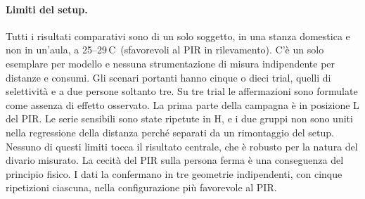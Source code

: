 \paragraph{Limiti del setup.} Tutti i risultati comparativi sono di un solo soggetto,
in una stanza domestica e non in un'aula, a 25--29\,\textdegree C\ (sfavorevoli al PIR
in rilevamento). C'è un solo esemplare per modello e nessuna strumentazione di misura
indipendente per distanze e consumi. Gli scenari portanti hanno cinque o dieci trial,
quelli di selettività e a due persone soltanto tre. Su tre trial le affermazioni sono
formulate come assenza di effetto osservato. La prima parte della campagna è in
posizione L del PIR. Le serie sensibili sono state ripetute in H, e i due gruppi non
sono uniti nella regressione della distanza perché separati da un rimontaggio del
setup. Nessuno di questi limiti tocca il risultato centrale, che è robusto per la
natura del divario misurato. La cecità del PIR sulla persona ferma è una conseguenza
del principio fisico. I dati la confermano in tre geometrie indipendenti, con cinque
ripetizioni ciascuna, nella configurazione più favorevole al PIR.
